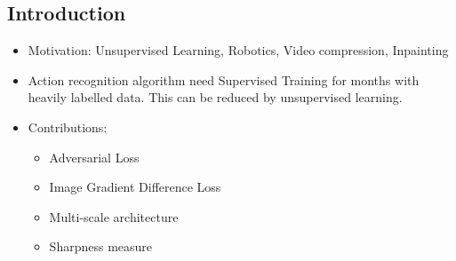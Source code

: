 \documentclass{article}
\begin{document}
    \subsection{Introduction}\label{subsec:Deep_Multi_Scale_Video_Prediction_Beyond_Mean_Square_Error:introduction}
    \begin{itemize}
        \item Motivation: Unsupervised Learning, Robotics, Video compression, Inpainting
        \item Action recognition algorithm need Supervised Training for months with heavily labelled data.
        This can be reduced by unsupervised learning.
        \item Contributions:
        \begin{itemize}
            \item Adversarial Loss
            \item Image Gradient Difference Loss
            \item Multi-scale architecture
            \item Sharpness measure
        \end{itemize}
    \end{itemize}
\end{document}
